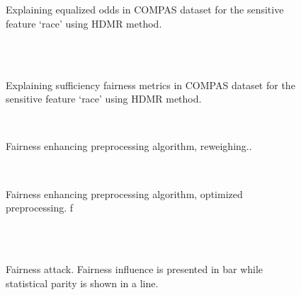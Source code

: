 \begin{figure}
	\centering
	\\
	\\
	\caption{Explaining equalized odds in COMPAS dataset for the sensitive feature `race' using HDMR method.}
\end{figure}


\begin{figure}
	\centering
	\\
	\\
	\caption{Explaining sufficiency fairness metrics in COMPAS dataset for the sensitive feature `race' using HDMR method.}
\end{figure}


\begin{figure}
	\centering
	\\
	\caption{Fairness enhancing preprocessing algorithm, reweighing..}
\end{figure}

\begin{figure}
	\centering
	\\
	\caption{Fairness enhancing preprocessing algorithm, optimized preprocessing. f}
\end{figure}


\begin{figure}
	\centering
	\\
	\\
	\caption{Fairness attack. Fairness influence is presented  in bar while statistical parity is shown in a line.}
\end{figure}


